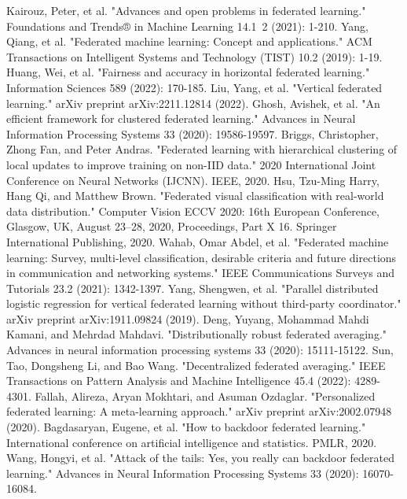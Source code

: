 \documentclass[conference]{IEEEtran}
\begin{document}
\begin{thebibliography}{00}
     Kairouz, Peter, et al. "Advances and open problems in federated learning." Foundations and Trends® in Machine Learning 14.1~2 (2021): 1-210.
     Yang, Qiang, et al. "Federated machine learning: Concept and applications." ACM Transactions on Intelligent Systems and Technology (TIST) 10.2 (2019): 1-19.
     Huang, Wei, et al. "Fairness and accuracy in horizontal federated learning." Information Sciences 589 (2022): 170-185.
     Liu, Yang, et al. "Vertical federated learning." arXiv preprint arXiv:2211.12814 (2022).
     Ghosh, Avishek, et al. "An efficient framework for clustered federated learning." Advances in Neural Information Processing Systems 33 (2020): 19586-19597.
     Briggs, Christopher, Zhong Fan, and Peter Andras. "Federated learning with hierarchical clustering of local updates to improve training on non-IID data." 2020 International Joint Conference on Neural Networks (IJCNN). IEEE, 2020.
     Hsu, Tzu-Ming Harry, Hang Qi, and Matthew Brown. "Federated visual classification with real-world data distribution." Computer Vision ECCV 2020: 16th European Conference, Glasgow, UK, August 23–28, 2020, Proceedings, Part X 16. Springer International Publishing, 2020.
     Wahab, Omar Abdel, et al. "Federated machine learning: Survey, multi-level classification, desirable criteria and future directions in communication and networking systems." IEEE Communications Surveys and Tutorials 23.2 (2021): 1342-1397.
     Yang, Shengwen, et al. "Parallel distributed logistic regression for vertical federated learning without third-party coordinator." arXiv preprint arXiv:1911.09824 (2019).
     Deng, Yuyang, Mohammad Mahdi Kamani, and Mehrdad Mahdavi. "Distributionally robust federated averaging." Advances in neural information processing systems 33 (2020): 15111-15122.
     Sun, Tao, Dongsheng Li, and Bao Wang. "Decentralized federated averaging." IEEE Transactions on Pattern Analysis and Machine Intelligence 45.4 (2022): 4289-4301.
     Fallah, Alireza, Aryan Mokhtari, and Asuman Ozdaglar. "Personalized federated learning: A meta-learning approach." arXiv preprint arXiv:2002.07948 (2020).
     Bagdasaryan, Eugene, et al. "How to backdoor federated learning." International conference on artificial intelligence and statistics. PMLR, 2020.
     Wang, Hongyi, et al. "Attack of the tails: Yes, you really can backdoor federated learning." Advances in Neural Information Processing Systems 33 (2020): 16070-16084.

\end{thebibliography}
\end{document}
